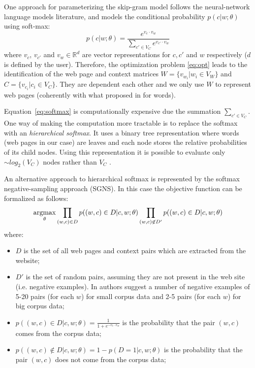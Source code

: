 One approach for parameterizing the skip-gram model follows the neural-network language models literature, and models the conditional probability $p(c|w;\theta)$ using
soft-max:
\begin{equation}
\label{eq:softmax}
p(c|w;\theta) = \frac{e^{v_c \cdot v_w}}{\sum_{c' \in V_C} e^{v_{c'} \cdot v_w} }
\end{equation}
where $v_c$, $v_{c'}$ and  $v_w \in \mathbb{R}^d$ are vector representations for $c, c'$ and $w$ respectively ($d$ is defined by the user). Therefore, the optimization problem \eqref{eq:opt} leads to the identification of the web page and context matrices $W = \{v_{w_i}| w_i \in V_W \}$ and $C= \{v_{c_i}| c_i \in V_C \}$.  They are dependent each other and we only use $W$ to represent web pages (coherently with what proposed in \cite{Mikolov:2013} for words).


Equation~\ref{eq:softmax} is computationally expensive due the summation $\sum_{c' \in V_C}$. One way of making the computation more tractable is to replace the softmax with an \emph{hierarchical softmax}. It uses a binary tree representation where words (web pages in our case) are leaves and each node stores the relative probabilities of its child nodes. Using this representation it is possible to evaluate only  $\sim log_2(V_C)$ nodes rather than $V_C$ \cite{Mikolov:2013}.



An alternative approach to hierarchical softmax is represented by the softmax negative-sampling approach (SGNS). In this case the objective function can be formalized as follows:
\begin{equation} 
\operatornamewithlimits{argmax}_{\theta} \prod_{(w,c) \in D}p((w,c)\in D| c,w; \theta) \prod_{(w,c) \not \in D'}p((w,c)\in D| c,w; \theta)
\end{equation}
where:
\begin{itemize}
\item $D$ is the set of all web pages and context pairs which are extracted from the website; 
\item $D'$ is the set of random pairs, assuming they are not present in the web site (i.e. negative examples). In \cite{Mikolov:2013} authors suggest a number of negative examples of 5-20 pairs (for each $w$) for small corpus data and 2-5 pairs (for each $w$) for big corpus data;
\item $p((w,c) \in D|c,w; \theta) = \frac{1}{1 + e^{-v_c \cdot v_w}}$ is the probability that the pair $(w, c)$ comes from the corpus data;
\item $p((w,c) \not \in D|c,w; \theta) = 1 - p(D=1|c,w; \theta)$ is the probability that the pair $(w, c)$ does not come from the corpus data;
\end{itemize}

